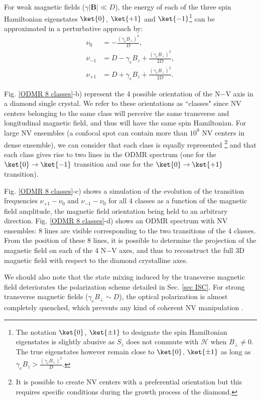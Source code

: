 \documentclass[a4paper, 11pt]{report}
\begin{document}
For weak magnetic fields ($\gamma |\textbf{B}| \ll D$), the energy of each of the three spin Hamiltonian eigenstates $\ket{0}$, $\ket{+1}$ and $\ket{-1}$\footnote{The notation $\ket{0}$, $\ket{\pm 1}$ to designate the spin Hamiltonian eigenstates is slightly abusive as $S_z$ does not commute with $\mathcal{H}$ when $B_\perp \neq 0$. The true eigenstates however remain close to $\ket{0}$, $\ket{\pm 1}$ as long as $\gamma_e B_z > \frac{(\gamma_e B_\perp)^2}{D}$.} can be approximated in a perturbative approach by: %
\begin{align}
\nu_0&= -\frac{(\gamma_e B_\perp)^2}{D}, \nonumber \\
\nu_{-1} &= D - \gamma_e B_z + \frac{(\gamma_e B_\perp)^2}{2D}, \nonumber \\
\nu_{+1} &= D + \gamma_e B_z + \frac{(\gamma_e B_\perp)^2}{2D}.
\end{align}

Fig. \ref{ODMR 8 classes}-b) represent the 4 possible orientation of the N$-$V axis in a diamond single crystal. We refer to these orientations as ``classes" since NV centers belonging to the same class will perceive the same transverse and longitudinal magnetic field, and thus will have the same spin Hamiltonian. For large NV ensembles (a confocal spot can contain more than $10^9$ NV centers in dense ensemble), we can consider that each class is equally represented \footnote{It is possible to create NV centers with a preferential orientation \citep{lesik2014perfect} but this requires specific conditions during the growth process of the diamond.} and that each class gives rise to two lines in the ODMR spectrum (one for the $\ket{0} \to \ket{-1}$ transition and one for the $\ket{0} \to \ket{+1}$ transition). 

Fig. \ref{ODMR 8 classes}-c) shows a simulation of the evolution of the transition frequencies $\nu_{+1} - \nu_{0}$ and $\nu_{-1} - \nu_{0}$ for all 4 classes as a function of the magnetic field amplitude, the magnetic field orientation being held to an arbitrary direction. Fig. \ref{ODMR 8 classes}-d) shows an ODMR spectrum with NV ensembles: 8 lines are visible corresponding to the two transitions of the 4 classes. From the position of these 8 lines, it is possible to determine the projection of the magnetic field on each of the 4 N$-$V axes, and thus to reconstruct the full 3D magnetic field with respect to the diamond crystalline axes.

We should also note that the state mixing induced by the transverse magnetic field deteriorates the polarization scheme detailed in Sec. \ref{sec ISC}. For strong transverse magnetic fields ($\gamma_e B_\perp \sim D$), the optical polarization is almost completely quenched, which prevents any kind of coherent NV manipulation \citep{tetienne2012magnetic}.
\end{document}
